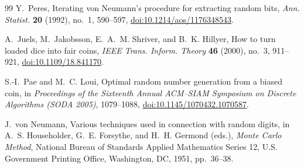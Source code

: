 \documentclass[11pt]{article}
\theoremstyle{definition}
\theoremstyle{remark}
\begin{document}
\begin{thebibliography}{99}
Y.~Peres,
\newblock Iterating von Neumann's procedure for extracting random bits,
\newblock \emph{Ann. Statist.} \textbf{20} (1992), no.~1, 590--597,
\newblock \href{https://doi.org/10.1214/aos/1176348543}
{doi:10.1214/aos/1176348543}.

A.~Juels, M.~Jakobsson, E.~A.~M. Shriver, and B.~K. Hillyer,
\newblock How to turn loaded dice into fair coins,
\newblock \emph{IEEE Trans. Inform. Theory} \textbf{46} (2000), no.~3, 911--921,
\newblock \href{https://doi.org/10.1109/18.841170}
{doi:10.1109/18.841170}.

S.-I.~Pae and M.~C. Loui,
\newblock Optimal random number generation from a biased coin,
\newblock in \emph{Proceedings of the Sixteenth Annual ACM--SIAM Symposium
on Discrete Algorithms (SODA 2005)}, 1079--1088,
\newblock \href{https://doi.org/10.1145/1070432.1070587}
{doi:10.1145/1070432.1070587}.

J.~von Neumann,
\newblock Various techniques used in connection with random digits,
\newblock in A.~S. Householder, G.~E. Forsythe, and H.~H. Germond (eds.),
\emph{Monte Carlo Method}, National Bureau of Standards Applied Mathematics
Series 12, U.S. Government Printing Office, Washington, DC, 1951,
pp.~36--38.

\end{thebibliography}
\end{document}
